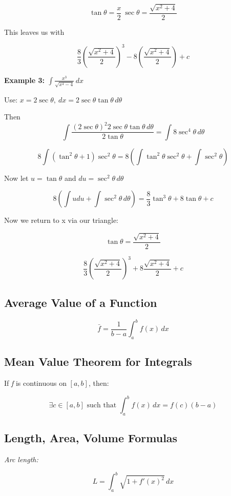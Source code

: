 \[
    \tan\theta = \frac{x}{2}\ \sec\theta = \frac{\sqrt{x^2 + 4}}{2}
\]

This leaves us with

\[
    \frac{8}{3} {\left(\frac{\sqrt{x^2 + 4}}{2}\right)}^3 - 8 \left( \frac{\sqrt{x^2 + 4}}{2}\right) + c
\]

\textbf{Example 3: \( \int \frac{x^3}{\sqrt{x^4 - 4}} \,dx \)}
\vspace{\baselineskip}

Use: \(x = 2\sec \theta, \ dx = 2\sec \theta \tan \theta \,d\theta \)

Then
\[
    \int \frac{{(2\sec\theta)}^2 2\sec\theta \tan\theta \,d\theta}{2\tan\theta} = \int 8\sec^4 \theta\,d\theta
\]

\[
    8\int(\tan^2\theta + 1)\sec^2\theta = 8\left(\int\tan^2\theta\sec^2\theta + \int \sec^2\theta \right)
\]

Now let \(u = \tan\theta\) and \(du = \sec^2\theta \,d\theta\)

\[
    8\left( \int udu  + \int \sec^2\theta\,d\theta\right) = 
    \frac{8}{3}\tan^3\theta + 8\tan\theta + c
\]

Now we return to x via our triangle:

\[
    \tan\theta = \frac{\sqrt{x^2 + 4}}{2}
\]

\[
    \frac{8}{3}{\left(\frac{\sqrt{x^2 + 4}}{2}\right)}^3 + 8 \frac{\sqrt{x^2 + 4}}{2} + c
\]

\subsection{Average Value of a Function}

\[
    \bar{f} = \frac{1}{b - a} \int_a^b f(x)\,dx
\]

\subsection{Mean Value Theorem for Integrals}

If \emph{f} is continuous on \([a, b]\), then:

\[
    \exists c \in [a, b] \text{ such that } \int_a^b f(x)\,dx = f(c)(b - a)
\]

\subsection{Length, Area, Volume Formulas}

\emph{Arc length:}

\[
    L = \int_a^b \sqrt{1 + {f'(x)}^2}\,dx
\]

